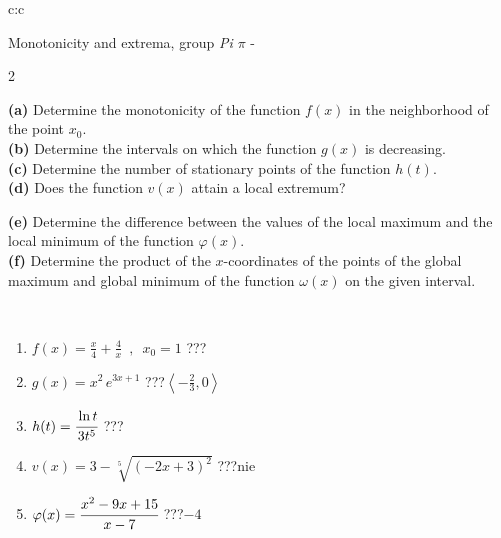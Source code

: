 \documentclass[10pt]{report}
\begin{document}
\begin{tabular}{c:c}
\begin{minipage}[c][104.5mm][t]{0.5\linewidth}
\begin{center}
\vspace{5mm}
{\huge Monotonicity and extrema, group \textit{Pi $\pi$} -}\\[5mm]
\begin{minipage}{0.95\linewidth}
\begin{center}
{\small \begin{multicols}{2} \raggedright
\textbf{(a)} Determine the monotonicity of the function \(f(x)\) in the neighborhood of the point \(x_0\). \\[1mm]
\textbf{(b)} Determine the intervals on which the function \(g(x)\) is decreasing. \\[1mm]
\textbf{(c)} Determine the number of stationary points of the function \(h(t)\). \\[1mm]
\textbf{(d)} Does the function \(v(x)\) attain a local extremum? \par \columnbreak
\textbf{(e)} Determine the difference between the values of the local maximum and the local minimum of the function \(\varphi(x)\). \\[1mm]
\textbf{(f)} Determine the product of the \(x\)-coordinates of the points of the global maximum and global minimum of the function \(\omega(x)\) on the given interval. \\[1mm]
\end{multicols}
}
\end{center}
\end{minipage}
\\[1mm]
\begin{minipage}{0.79\linewidth}
\begin{center}
\begin{varwidth}{\linewidth}
\setlength{\itemsep}{0pt}
\begin{enumerate}
\normalsize
\item $f(x)=\frac{x}{4}+\frac{4}{x} \enspace , \enspace x_0=1$\quad \dotfill\; ???\;\dotfill \quad {}
\item $g(x)=x^2\, e^{3x+1}$\quad \dotfill\; ???\;\dotfill \quad $\left\langle-\frac{2}{3} , 0\right\rangle$
\item $h(t)=\cfrac{\ln t}{3t^5}$\quad \dotfill\; ???\;\dotfill {}
\item $v(x)=3-\sqrt[5]{(-2x+3)^2}$\quad \dotfill\; ???\;\dotfill \quad $\text{nie}$
\item $\varphi(x)=\cfrac{x^2-9x+15}{x-7}$\quad \dotfill\; ???\;\dotfill \quad $-4$

\end{enumerate}
\end{varwidth}
\end{center}
\end{minipage}
\end{center}
\end{minipage}
\end{tabular}
\end{document}
